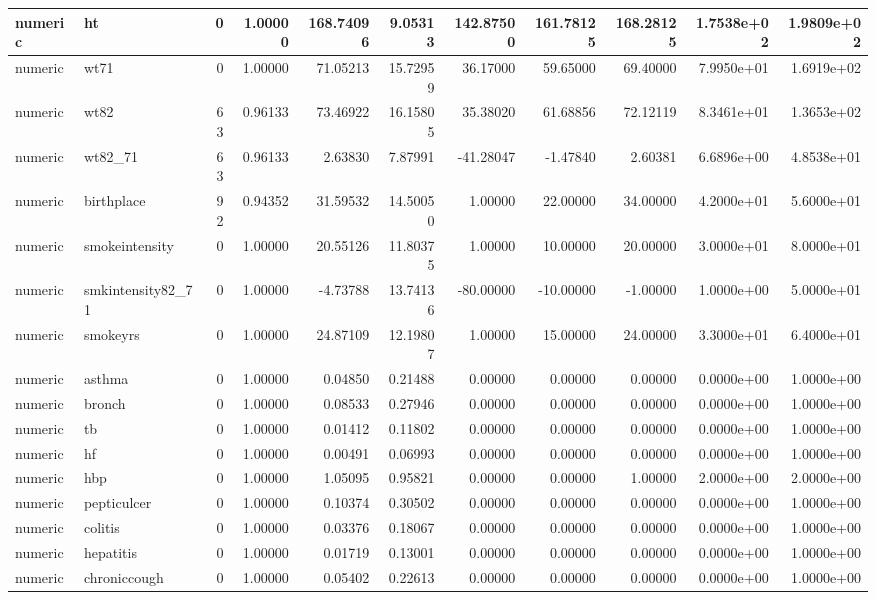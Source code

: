 \documentclass[12pt, krantz2,]{book}
\theoremstyle{definition}
\theoremstyle{definition}
\theoremstyle{definition}
\newcommand{\1}{\mathbbm{1}}
\begin{document}
\begin{tabular}{l|l|r|r|r|r|r|r|r|r|r}
\hline
numeric & ht & 0 & 1.00000 & 168.74096 & 9.05313 & 142.87500 & 161.78125 & 168.28125 & 1.7538e+02 & 1.9809e+02\\
\hline
numeric & wt71 & 0 & 1.00000 & 71.05213 & 15.72959 & 36.17000 & 59.65000 & 69.40000 & 7.9950e+01 & 1.6919e+02\\
\hline
numeric & wt82 & 63 & 0.96133 & 73.46922 & 16.15805 & 35.38020 & 61.68856 & 72.12119 & 8.3461e+01 & 1.3653e+02\\
\hline
numeric & wt82\_71 & 63 & 0.96133 & 2.63830 & 7.87991 & -41.28047 & -1.47840 & 2.60381 & 6.6896e+00 & 4.8538e+01\\
\hline
numeric & birthplace & 92 & 0.94352 & 31.59532 & 14.50050 & 1.00000 & 22.00000 & 34.00000 & 4.2000e+01 & 5.6000e+01\\
\hline
numeric & smokeintensity & 0 & 1.00000 & 20.55126 & 11.80375 & 1.00000 & 10.00000 & 20.00000 & 3.0000e+01 & 8.0000e+01\\
\hline
numeric & smkintensity82\_71 & 0 & 1.00000 & -4.73788 & 13.74136 & -80.00000 & -10.00000 & -1.00000 & 1.0000e+00 & 5.0000e+01\\
\hline
numeric & smokeyrs & 0 & 1.00000 & 24.87109 & 12.19807 & 1.00000 & 15.00000 & 24.00000 & 3.3000e+01 & 6.4000e+01\\
\hline
numeric & asthma & 0 & 1.00000 & 0.04850 & 0.21488 & 0.00000 & 0.00000 & 0.00000 & 0.0000e+00 & 1.0000e+00\\
\hline
numeric & bronch & 0 & 1.00000 & 0.08533 & 0.27946 & 0.00000 & 0.00000 & 0.00000 & 0.0000e+00 & 1.0000e+00\\
\hline
numeric & tb & 0 & 1.00000 & 0.01412 & 0.11802 & 0.00000 & 0.00000 & 0.00000 & 0.0000e+00 & 1.0000e+00\\
\hline
numeric & hf & 0 & 1.00000 & 0.00491 & 0.06993 & 0.00000 & 0.00000 & 0.00000 & 0.0000e+00 & 1.0000e+00\\
\hline
numeric & hbp & 0 & 1.00000 & 1.05095 & 0.95821 & 0.00000 & 0.00000 & 1.00000 & 2.0000e+00 & 2.0000e+00\\
\hline
numeric & pepticulcer & 0 & 1.00000 & 0.10374 & 0.30502 & 0.00000 & 0.00000 & 0.00000 & 0.0000e+00 & 1.0000e+00\\
\hline
numeric & colitis & 0 & 1.00000 & 0.03376 & 0.18067 & 0.00000 & 0.00000 & 0.00000 & 0.0000e+00 & 1.0000e+00\\
\hline
numeric & hepatitis & 0 & 1.00000 & 0.01719 & 0.13001 & 0.00000 & 0.00000 & 0.00000 & 0.0000e+00 & 1.0000e+00\\
\hline
numeric & chroniccough & 0 & 1.00000 & 0.05402 & 0.22613 & 0.00000 & 0.00000 & 0.00000 & 0.0000e+00 & 1.0000e+00\\

\end{tabular}
\end{document}
